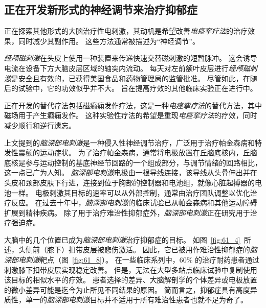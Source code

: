 \subsection{正在开发新形式的神经调节来治疗抑郁症}

正在探索其他形式的大脑治疗性电刺激，其动机是希望改善\textit{电痉挛疗法}的治疗效果，同时减少其副作用。
这些方法通常被描述为“神经调节”。


\textit{经颅磁刺激}在头皮上使用一种装置来传递快速交替磁刺激的短暂脉冲。
这会诱导电流在设备下方大脑皮层区域的轴突内流动。
每天对左前额叶皮层进行\textit{经颅磁刺激}是安全且有效的，已获得美国食品和药物管理局的监管批准。
尽管如此，在随后的试验中，它的功效似乎并不大。
旨在提高疗效的其他临床实验正在进行中。


正在开发的替代疗法包括磁癫痫发作疗法，这是一种\textit{电痉挛疗法}的替代方法，其中磁场用于产生癫痫发作。
这种实验性疗法的希望是重现\textit{电痉挛疗法}的疗效，同时减少顺行和逆行遗忘。


上文提到的\textit{脑深部电刺激}是一种侵入性神经调节治疗，广泛用于治疗帕金森病和特发性震颤的运动症状。
为了治疗帕金森病，通常将电极放置在丘脑底核内，丘脑底核是参与运动控制的基底神经节回路的一个组成部分，与调节情绪的回路相比，这一点已广为人知。
\textit{脑深部电刺激}电极由一根导线连接，该导线从头骨伸出并在头皮和颈部皮肤下行进，连接到位于胸部的控制器和电池组，就像心脏起搏器的电池一样。
电极刺激其目标的速率可以从外部控制，通常由治疗团队调整以优化治疗反应。
在过去十年中，\textit{脑深部电刺激}的临床试验已从帕金森病和其他运动障碍扩展到精神疾病。
除了用于治疗难治性抑郁症外，\textit{脑深部电刺激}正在研究用于治疗强迫症。


大脑中的几个位置已成为\textit{脑深部电刺激}治疗抑郁症的目标。
如图~\ref{fig:61_4}~所述，头侧前（膝下）扣带皮层被悲伤激活。
因此，它已被用作难治性抑郁症的\textit{脑深部电刺激}靶点（图~\ref{fig:61_8}）。
在一些临床系列中，60\% 的治疗耐药患者通过刺激膝下扣带皮层实现稳定改善。
但是，无法在大型多站点临床试验中复制使用该目标的相似水平的疗效。
患者选择的差异、大脑解剖学的个体差异或电极放置的微小差异可能是迄今为止所见不同结果的原因。
简而言之，抑郁症具有高度异质性，单一的\textit{脑深部电刺激}目标并不适用于所有难治性患者也就不足为奇了。


